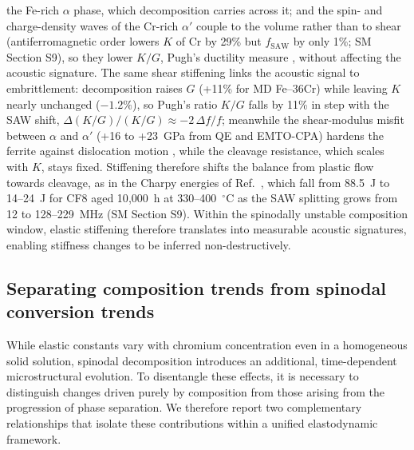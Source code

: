 \documentclass[final,3p,times]{elsarticle}
\begin{document}
the Fe-rich $\alpha$ phase, which decomposition carries across it; and the spin- and charge-density waves of the Cr-rich $\alpha'$ couple to the volume rather than to shear (antiferromagnetic order lowers $K$ of Cr by 29\% but $f_{\mathrm{SAW}}$ by only 1\%; SM Section S9), so they lower $K/G$, Pugh's ductility measure \cite{pugh1954xcii}, without affecting the acoustic signature. The same shear stiffening links the acoustic signal to embrittlement: decomposition raises $G$ (+11\% for MD Fe--36Cr) while leaving $K$ nearly unchanged ($-1.2\%$), so Pugh's ratio $K/G$ falls by 11\% \cite{pugh1954xcii} in step with the SAW shift, $\Delta(K/G)/(K/G)\approx-2\,\Delta f/f$; meanwhile the shear-modulus misfit between $\alpha$ and $\alpha'$ (+16 to +23~GPa from QE and EMTO-CPA) hardens the ferrite against dislocation motion \cite{kato1981hardening}, while the cleavage resistance, which scales with $K$, stays fixed. Stiffening therefore shifts the balance from plastic flow towards cleavage, as in the Charpy energies of Ref.~\cite{al2023detecting}, which fall from 88.5~J to 14--24~J for CF8 aged 10{,}000~h at 330--400~$^\circ$C as the SAW splitting grows from 12 to 128--229~MHz (SM Section S9). Within the spinodally unstable composition window, elastic stiffening therefore translates into measurable acoustic signatures, enabling stiffness changes to be inferred non-destructively.

\subsection{Separating composition trends from spinodal conversion trends}

While elastic constants vary with chromium concentration even in a homogeneous solid solution, spinodal decomposition introduces an additional, time-dependent microstructural evolution. To disentangle these effects, it is necessary to distinguish changes driven purely by composition from those arising from the progression of phase separation. We therefore report two complementary relationships that isolate these contributions within a unified elastodynamic framework.
\end{document}
